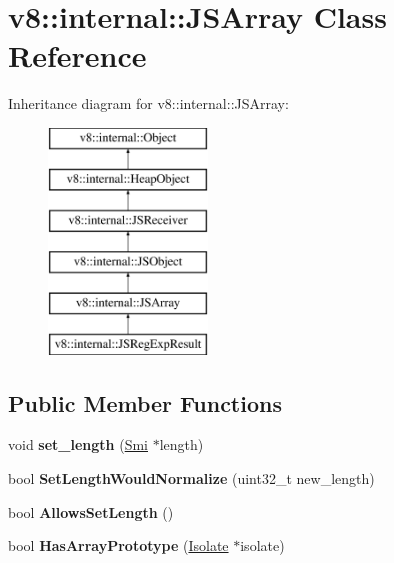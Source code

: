 \hypertarget{classv8_1_1internal_1_1_j_s_array}{}\section{v8\+:\+:internal\+:\+:J\+S\+Array Class Reference}
\label{classv8_1_1internal_1_1_j_s_array}
Inheritance diagram for v8\+:\+:internal\+:\+:J\+S\+Array\+:\begin{figure}[H]
\begin{center}
\leavevmode
\includegraphics[height=6.000000cm]{classv8_1_1internal_1_1_j_s_array}
\end{center}
\end{figure}
\subsection*{Public Member Functions}
\begin{DoxyCompactItemize}
\item 
void {\bfseries set\+\_\+length} (\hyperlink{classv8_1_1internal_1_1_smi}{Smi} $\ast$length)\hypertarget{classv8_1_1internal_1_1_j_s_array_a161cb54446d5b70543257297463c72ab}{}\label{classv8_1_1internal_1_1_j_s_array_a161cb54446d5b70543257297463c72ab}

\item 
bool {\bfseries Set\+Length\+Would\+Normalize} (uint32\+\_\+t new\+\_\+length)\hypertarget{classv8_1_1internal_1_1_j_s_array_a08a73b7a43f807fb88bf9df19855fad3}{}\label{classv8_1_1internal_1_1_j_s_array_a08a73b7a43f807fb88bf9df19855fad3}

\item 
bool {\bfseries Allows\+Set\+Length} ()\hypertarget{classv8_1_1internal_1_1_j_s_array_ae90f5435e217abb3debb5b5e28ec4eb5}{}\label{classv8_1_1internal_1_1_j_s_array_ae90f5435e217abb3debb5b5e28ec4eb5}

\item 
bool {\bfseries Has\+Array\+Prototype} (\hyperlink{classv8_1_1internal_1_1_isolate}{Isolate} $\ast$isolate)\hypertarget{classv8_1_1internal_1_1_j_s_array_a942aa05a4af5d802acf8679cf5c35a82}{}\label{classv8_1_1internal_1_1_j_s_array_a942aa05a4af5d802acf8679cf5c35a82}

\end{DoxyCompactItemize}
